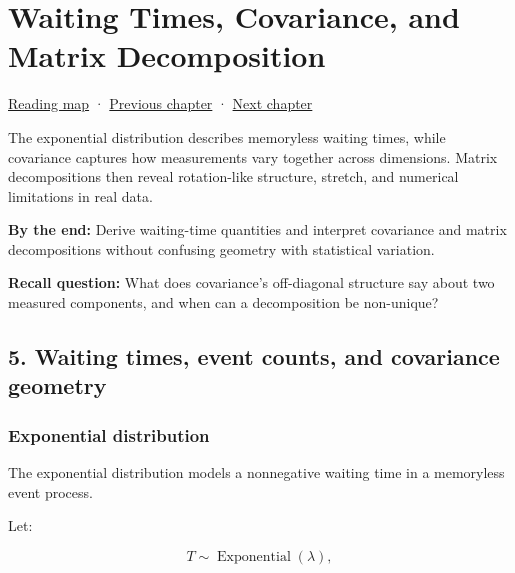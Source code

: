 \chapter{Waiting Times, Covariance, and Matrix Decomposition}\label{02-foundations-ii-ch024-waiting-times-covariance-and-matrix-decomposition}\hypertarget{02-foundations-ii-ch024}{}\label{stagechapter:02-foundations-ii-ch024}

\hypertarget{02-foundations-ii-ch024-waiting-times-covariance-and-matrix-decomposition}{}

\hyperref[volume-reading-map]{Reading map} · \hyperref[02-foundations-ii-ch023-probability-models-and-measurement-error]{Previous chapter} · \hyperref[02-foundations-ii-ch025-continuous-models-and-numerical-error]{Next chapter}

The exponential distribution describes memoryless waiting times, while covariance captures how measurements vary together across dimensions. Matrix decompositions then reveal rotation-like structure, stretch, and numerical limitations in real data.

\textbf{By the end:} Derive waiting-time quantities and interpret covariance and matrix decompositions without confusing geometry with statistical variation.

\textbf{Recall question:} What does covariance's off-diagonal structure say about two measured components, and when can a decomposition be non-unique?

\section{5. Waiting times, event counts, and covariance geometry}\label{02-foundations-ii-ch024-waiting-times-event-counts-and-covariance-geometry}

\hypertarget{02-foundations-ii-ch024-waiting-times-event-counts-and-covariance-geometry}{}

\subsection{Exponential distribution}\label{02-foundations-ii-ch024-exponential-distribution}

\hypertarget{02-foundations-ii-ch024-exponential-distribution}{}

The exponential distribution models a nonnegative waiting time in a memoryless event process.

Let:

\[
 T\sim\operatorname{Exponential}(\lambda),
\]

